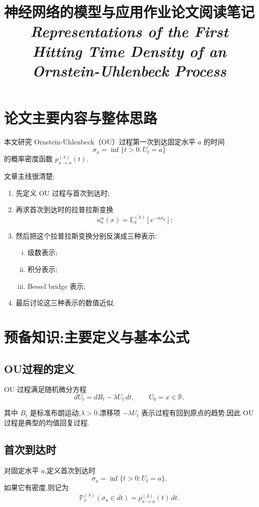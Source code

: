 \documentclass[oneside]{ctexart}
\title{神经网络的模型与应用作业论文阅读笔记\\[0.6ex]
\large  \textit{Representations of the First Hitting Time Density of an Ornstein-Uhlenbeck Process} }
\author{}
\date{}
\begin{document}
\maketitle

\section{论文主要内容与整体思路}

本文研究 Ornstein-Uhlenbeck（OU）过程第一次到达固定水平 $a$ 的时间
\[
    \sigma_a=\inf\{t>0:U_t=a\}
\]
的概率密度函数 $p_{x\to a}^{(\lambda)}(t)$.

文章主线很清楚:

\begin{enumerate}[(1)]
    \item 先定义 OU 过程与首次到达时;
    \item 再求首次到达时的拉普拉斯变换
          \[
              u_{a}^{\alpha}(x)=\mathbb{E}_x^{(\lambda)}[e^{-\alpha\sigma_a}] ;
          \]
    \item 然后把这个拉普拉斯变换分别反演成三种表示:
          \begin{enumerate}[(i)]
              \item 级数表示;
              \item 积分表示;
              \item Bessel bridge 表示;
          \end{enumerate}
    \item 最后讨论这三种表示的数值近似.
\end{enumerate}

\section{预备知识:主要定义与基本公式}

\subsection{OU过程的定义}

OU 过程满足随机微分方程
\begin{equation}\label{eq:ou}
    dU_t=dB_t-\lambda U_t\,dt,\qquad U_0=x\in\mathbb{R}.
\end{equation}

其中 $B_t$ 是标准布朗运动,$\lambda>0$.漂移项 $-\lambda U_t$ 表示过程有回到原点的趋势,因此 OU 过程是典型的均值回复过程.

\subsection{首次到达时}
对固定水平 $a$,定义首次到达时
\[
    \sigma_a=\inf\{t>0:U_t=a\}.
\]
如果它有密度,则记为
\[
    \mathbb{P}_x^{(\lambda)}(\sigma_a\in dt)=p_{x\to a}^{(\lambda)}(t)\,dt.
\]
\end{document}
